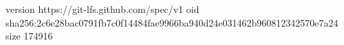 version https://git-lfs.github.com/spec/v1
oid sha256:2c6e28bac0791fb7c0f14484fae9966ba940d24e031462b960812342570e7a24
size 174916
